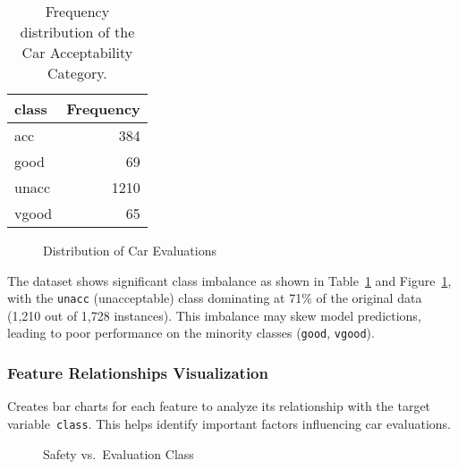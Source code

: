 \documentclass[
  letterpaper,
  DIV=11,
  numbers=noendperiod]{scrartcl}
\begin{document}
\begin{longtable}[]{@{}lr@{}}

\caption{\label{tbl-frequency_distri_car}Frequency distribution of the
Car Acceptability Category.}

\tabularnewline

\toprule\noalign{}
class & Frequency \\
\midrule\noalign{}
\endhead
\bottomrule\noalign{}
\endlastfoot
acc & 384 \\
good & 69 \\
unacc & 1210 \\
vgood & 65 \\

\end{longtable}

\begin{figure}


\caption{\label{fig-car_distribution_plot}Distribution of Car
Evaluations}

\end{figure}%

The dataset shows significant class imbalance as shown in
Table~\ref{tbl-frequency_distri_car} and
Figure~\ref{fig-car_distribution_plot}, with the \texttt{unacc}
(unacceptable) class dominating at 71\% of the original data (1,210 out
of 1,728 instances). This imbalance may skew model predictions, leading
to poor performance on the minority classes (\texttt{good},
\texttt{vgood}).

\subsubsection{Feature Relationships
Visualization}\label{feature-relationships-visualization}

Creates bar charts for each feature to analyze its relationship with the
target variable~\texttt{class}. This helps identify important factors
influencing car evaluations.

\begin{figure}


\caption{\label{fig-car_safety_plot}Safety vs.~Evaluation Class}

\end{figure}%
\end{document}

